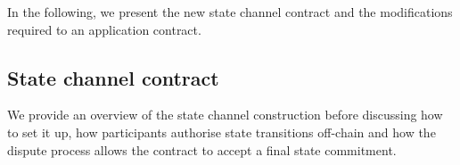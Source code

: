 \documentclass{llncs}
\begin{document}
In the following, we present the new state channel contract and the modifications required to an application contract. 


\subsection{State channel contract}


We provide an overview of the state channel construction before discussing how to set it up, how participants authorise state transitions off-chain and how the dispute process allows the contract to accept a final state commitment. 
\end{document}
